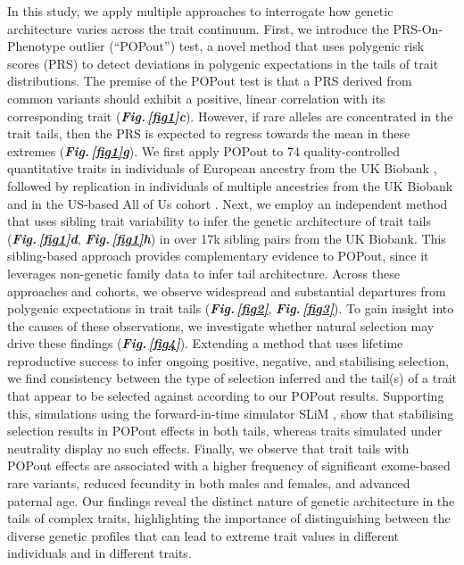 \documentclass[12pt]{zHenriquesLab-StyleBioRxiv}
\newcommand\fref[1]{\normalsize{\textbf{\textit{Fig.\,\ref{#1}}}}\normalsize{}}
\newcommand\dref[2]{\normalsize{\textbf{\textit{Fig.\,\ref{#1}#2}}}\normalsize{}}
\begin{document}
In this study, we apply multiple approaches to interrogate how genetic architecture varies 
across the trait continuum. First, we introduce the PRS-On-Phenotype outlier (“POPout”) test, 
a novel method that uses polygenic risk scores \cite{Choi2020} (PRS) to detect deviations 
in polygenic expectations in the tails of trait distributions. The premise of the POPout test 
is that a PRS derived from common variants should exhibit a positive, linear correlation with 
its corresponding trait (\dref{fig1}{c}). However, if rare alleles are concentrated in the trait tails, then the 
PRS is expected to regress towards the mean in these extremes (\dref{fig1}{g}). We first 
apply POPout to 74 quality-controlled quantitative traits in individuals of European ancestry 
from the UK Biobank \cite{Bycroft2018}, followed by replication in individuals of multiple ancestries 
from the UK Biobank and in the US-based All of Us cohort \cite{Bick2024}. Next, we employ an 
independent method \cite{Souaiaia2024} that uses sibling trait variability to infer the 
genetic architecture of trait tails (\dref{fig1}{d}, \dref{fig1}{h}) in over 17k sibling pairs from the UK Biobank. 
This sibling-based approach provides complementary evidence to POPout, since it leverages 
non-genetic family data to infer tail architecture. Across these approaches and cohorts, 
we observe widespread and substantial departures from polygenic expectations in trait tails (\fref{fig2}, \fref{fig3}). To gain insight into the causes of these observations, we investigate whether natural 
selection may drive these findings  (\fref{fig4}). Extending a method \cite{Sanjak2018} that 
uses lifetime reproductive success to infer ongoing positive, negative, and stabilising selection, 
we find consistency between the type of selection inferred and the tail(s) of a trait that 
appear to be selected against according to our POPout results. Supporting this, simulations using 
the forward-in-time simulator SLiM \cite{BC_2019}, show that stabilising selection results in POPout 
effects in both tails, whereas traits simulated under neutrality display no such effects. 
Finally, we observe that trait tails with POPout effects are associated with a higher frequency of 
significant exome-based rare variants, reduced fecundity in both males and females, and advanced 
paternal age. Our findings reveal the distinct nature of genetic architecture in the tails of 
complex traits, highlighting the importance of distinguishing between the diverse genetic profiles 
that can lead to extreme trait values in different individuals and in different traits.
\end{document}
